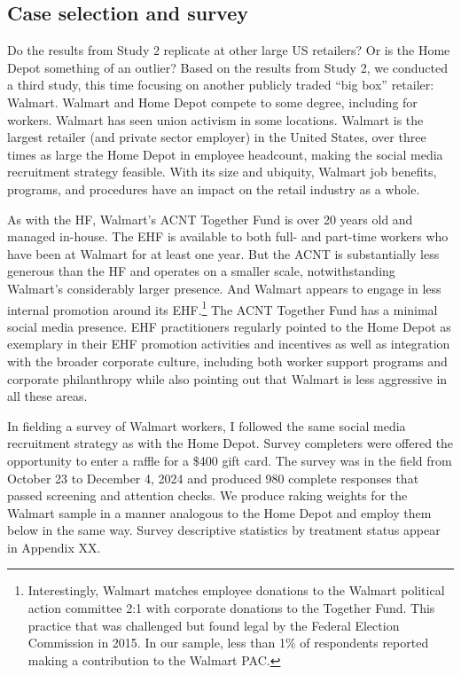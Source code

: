 \documentclass[
  11pt,
  oneside]{article}
\begin{document}
\subsection{Case selection and survey}\label{case-selection-and-survey}

Do the results from Study 2 replicate at other large US retailers? Or is the Home Depot something of an outlier? Based on the results from Study 2, we conducted a third study, this time focusing on another publicly traded ``big box'' retailer: Walmart. Walmart and Home Depot compete to some degree, including for workers. Walmart has seen union activism in some locations. Walmart is the largest retailer (and private sector employer) in the United States, over three times as large the Home Depot in employee headcount, making the social media recruitment strategy feasible. With its size and ubiquity, Walmart job benefits, programs, and procedures have an impact on the retail industry as a whole.

As with the HF, Walmart's ACNT Together Fund is over 20 years old and managed in-house. The EHF is available to both full- and part-time workers who have been at Walmart for at least one year. But the ACNT is substantially less generous than the HF and operates on a smaller scale, notwithstanding Walmart's considerably larger presence. And Walmart appears to engage in less internal promotion around its EHF.\footnote{Interestingly, Walmart matches employee donations to the Walmart political action committee 2:1 with corporate donations to the Together Fund. This practice that was challenged but found legal by the Federal Election Commission in 2015. In our sample, less than 1\% of respondents reported making a contribution to the Walmart PAC.} The ACNT Together Fund has a minimal social media presence. EHF practitioners regularly pointed to the Home Depot as exemplary in their EHF promotion activities and incentives as well as integration with the broader corporate culture, including both worker support programs and corporate philanthropy while also pointing out that Walmart is less aggressive in all these areas.

In fielding a survey of Walmart workers, I followed the same social media recruitment strategy as with the Home Depot. Survey completers were offered the opportunity to enter a raffle for a \$400 gift card. The survey was in the field from October 23 to December 4, 2024 and produced 980 complete responses that passed screening and attention checks. We produce raking weights for the Walmart sample in a manner analogous to the Home Depot and employ them below in the same way. Survey descriptive statistics by treatment status appear in Appendix XX.
\end{document}
